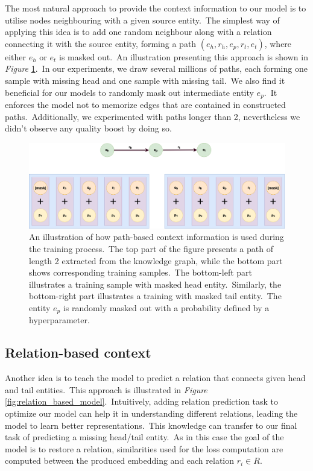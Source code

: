 \documentclass[longabstract, english, mgr]{iithesis}
\theoremstyle{default_theorem_style}\newtheorem{theorem}{Theorem}
\theoremstyle{default_theorem_style}\newtheorem{definition}{Definition}
\begin{document}
The most natural approach to provide the context information to our model is to utilise nodes neighbouring with a given
source entity.\ The simplest way of applying this idea is to add one random neighbour along with a relation connecting
it with the source entity, forming a path $(e_h, r_h, e_p, r_t, e_t)$, where either $e_h$ or $e_t$ is masked
out.\ An illustration presenting this approach is shown in \textit{Figure} \ref{fig:path_based_model}.\ In our
experiments, we draw several millions of paths, each forming one sample with missing head and one sample with missing
tail.\ We also find it beneficial for our models to randomly mask out intermediate entity $e_p$.\ It enforces the
model not to memorize edges that are contained in constructed paths.\ Additionally, we experimented with paths longer
than 2, nevertheless we didn't observe any quality boost by doing so.\newline

\begin{figure}[h!]
\centering
\includegraphics[scale=0.22]{path_based_model}
\caption{An illustration of how path-based context information is used during the training process.\ The top part
of the figure presents a path of length 2 extracted from the knowledge graph, while the bottom part shows corresponding
training samples.\ The bottom-left part illustrates a training sample with masked head entity.\ Similarly, the
bottom-right part illustrates a training with masked tail entity.\ The entity $e_p$ is randomly masked out with a
probability defined by a hyperparameter.}
\label{fig:path_based_model}
\end{figure}

\subsection{Relation-based context}

Another idea is to teach the model to predict a relation that connects given head and tail entities.\ This approach is
illustrated in \textit{Figure} \ref{fig:relation_based_model}.\ Intuitively, adding relation prediction task to
optimize our model can help it in understanding different relations, leading the model to learn better
representations.\ This knowledge can transfer to our final task of predicting a missing head/tail
entity.\ As in this case the goal of the model is to restore a relation, similarities used for the loss computation
are computed between the produced embedding and each relation $r_i \in R$.\newline
\end{document}
